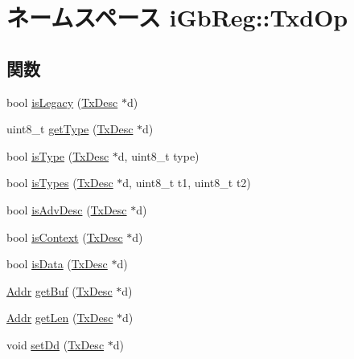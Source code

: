 \hypertarget{namespaceiGbReg_1_1TxdOp}{
\section{ネームスペース iGbReg::TxdOp}
\label{namespaceiGbReg_1_1TxdOp}
}
\subsection*{関数}
\begin{DoxyCompactItemize}
\item 
bool \hyperlink{namespaceiGbReg_1_1TxdOp_af55d26465a475bf81ed6f357bdf7c1b1}{isLegacy} (\hyperlink{structiGbReg_1_1TxDesc}{TxDesc} $\ast$d)
\item 
uint8\_\-t \hyperlink{namespaceiGbReg_1_1TxdOp_ad65ec34f7f59b2b32ca47bd649ebcb2a}{getType} (\hyperlink{structiGbReg_1_1TxDesc}{TxDesc} $\ast$d)
\item 
bool \hyperlink{namespaceiGbReg_1_1TxdOp_aa03874ccb0b42e0cc137487bd84279d4}{isType} (\hyperlink{structiGbReg_1_1TxDesc}{TxDesc} $\ast$d, uint8\_\-t type)
\item 
bool \hyperlink{namespaceiGbReg_1_1TxdOp_a0e959a47b95acd45e14d16adab0add82}{isTypes} (\hyperlink{structiGbReg_1_1TxDesc}{TxDesc} $\ast$d, uint8\_\-t t1, uint8\_\-t t2)
\item 
bool \hyperlink{namespaceiGbReg_1_1TxdOp_a9ba8413e17f0e3e37b80982bf38e1bf1}{isAdvDesc} (\hyperlink{structiGbReg_1_1TxDesc}{TxDesc} $\ast$d)
\item 
bool \hyperlink{namespaceiGbReg_1_1TxdOp_a91da43b92c742f43f0aee2bc07d15fe2}{isContext} (\hyperlink{structiGbReg_1_1TxDesc}{TxDesc} $\ast$d)
\item 
bool \hyperlink{namespaceiGbReg_1_1TxdOp_a6986d9be70f07915ad25bf0892c3c5d7}{isData} (\hyperlink{structiGbReg_1_1TxDesc}{TxDesc} $\ast$d)
\item 
\hyperlink{base_2types_8hh_af1bb03d6a4ee096394a6749f0a169232}{Addr} \hyperlink{namespaceiGbReg_1_1TxdOp_a363e2b2f2f55fcc8bdd1291609cc48db}{getBuf} (\hyperlink{structiGbReg_1_1TxDesc}{TxDesc} $\ast$d)
\item 
\hyperlink{base_2types_8hh_af1bb03d6a4ee096394a6749f0a169232}{Addr} \hyperlink{namespaceiGbReg_1_1TxdOp_ad1ccf1bd606d966d7549916b3562aebd}{getLen} (\hyperlink{structiGbReg_1_1TxDesc}{TxDesc} $\ast$d)
\item 
void \hyperlink{namespaceiGbReg_1_1TxdOp_aa4f81d41615115c41fcc39018aaff20e}{setDd} (\hyperlink{structiGbReg_1_1TxDesc}{TxDesc} $\ast$d)
\item 

\end{DoxyCompactItemize}
